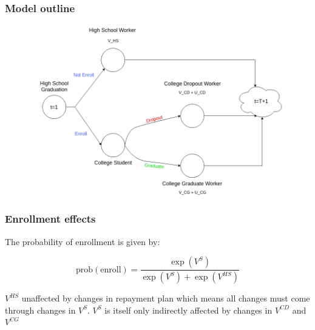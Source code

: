 \documentclass[10pt]{beamer}
\begin{document}
  \begin{frame} \frametitle{Model outline}

    \begin{figure}
      \begin{center}
       \includegraphics[width=\textwidth]{../ms/images/StudentLoans/LifeCycleChart.png}
      \end{center}
    \end{figure}

  \end{frame}

  \begin{frame} \frametitle{Enrollment effects}

    The probability of enrollment is given by:

    $$\text{prob}(\text{enroll}) = \frac{\exp(V^{S})}{\exp(V^{S}) + \exp(V^{HS})}$$

    \vspace{0.75cm}

    $V^{HS}$ unaffected by changes in repayment plan which means all changes must come through
    changes in $V^{S}$. $V^{S}$ is itself only indirectly affected by changes in $V^{CD}$ and
    $V^{CG}$

  \end{frame}
\end{document}
